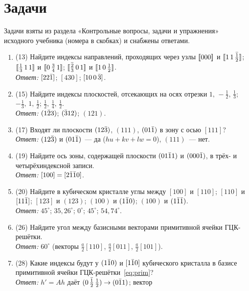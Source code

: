 \section*{Задачи}

Задачи взяты из раздела «Контрольные вопросы, задачи и упражнения»
исходного учебника (номера в скобках) и снабжены ответами.

\begin{enumerate}[label={\sffamily\bfseries\color{fmHead}\arabic*.}]
\item (13) Найдите индексы направлений, проходящих через узлы
$[\![000]\!]$ и $[\![1\,1\,\bar{\tfrac12}]\!]$; $[\![\tfrac13\,1\,1]\!]$ и
$[\![0\,\tfrac34\,1]\!]$; $[\![\bar{\tfrac23}\,0\,1]\!]$ и
$[\![1\,0\,\tfrac12]\!]$.\\
\emph{Ответ:} $[22\bar{1}]$; $[430]$; $[10\,0\,\bar{3}]$.
\item (15) Найдите индексы плоскостей, отсекающих на осях отрезки
$1,\,-\frac12,\,\frac13$; $-\frac13,\,1,\,\frac12$; $\frac12,\,\frac14,\,\frac12$.\\
\emph{Ответ:} $(1\bar{2}3)$; $(\bar{3}12)$; $(121)$.
\item (17) Входят ли плоскости $(12\bar{3})$, $(111)$, $(01\bar{1})$ в зону с осью
$[111]$?\\
\emph{Ответ:} $(12\bar{3})$ и $(01\bar{1})$~— да ($hu+kv+lw=0$), $(111)$~— нет.
\item (19) Найдите ось зоны, содержащей плоскости $(01\bar{1}1)$ и $(000\bar{1})$,
в трёх- и четырёхиндексной записи.\\
\emph{Ответ:} $[100]=[2\bar{1}\bar{1}0]$.
\item (20) Найдите в кубическом кристалле углы между $[100]$ и $[110]$;
$[110]$ и $[11\bar{1}]$; $[123]$ и $(123)$; $(100)$ и $(1\bar{1}0)$; $(100)$ и
$(1\bar{1}\bar{1})$.\\
\emph{Ответ:} $45^\circ$; $35{,}26^\circ$; $0^\circ$; $45^\circ$; $54{,}74^\circ$.
\item (26) Найдите угол между базисными векторами примитивной ячейки
ГЦК-решётки.\\
\emph{Ответ:} $60^\circ$ (векторы $\frac a2[110]$, $\frac a2[011]$,
$\frac a2[101]$).
\item (28) Какие индексы будут у $(1\bar{1}0)$ и $[1\bar{1}0]$ кубического кристалла в
базисе примитивной ячейки ГЦК-решётки~\eqref{eq:prim}?\\
\emph{Ответ:} $h'=Ah$ даёт $(0\,\bar{\tfrac12}\,\tfrac12)\to(0\bar{1}1)$; вектор

\end{enumerate}
